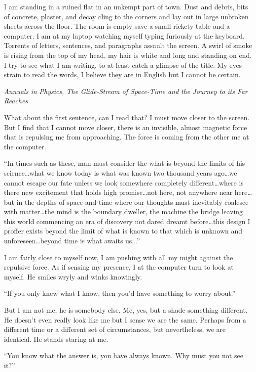 I am standing in a ruined flat in an unkempt part of town. Dust and
debris, bits of concrete, plaster, and decay cling to the corners and
lay out in large unbroken sheets across the floor. The room is empty
save a small rickety table and a computer. I am at my laptop watching
myself typing furiously at the keyboard. Torrents of letters, sentences,
and paragraphs assault the screen. A swirl of smoke is rising from the
top of my head, my hair is white and long and standing on end. I try to
see what I am writing, to at least catch a glimpse of the title. My eyes
strain to read the words, I believe they are in English but I cannot be
certain.

\emph{Annuals in Physics, The Glide-Stream of Space-Time and the Journey
to its Far Reaches}

What about the first sentence, can I read that? I must move closer to
the screen. But I find that I cannot move closer, there is an invisible,
almost magnetic force that is repulsing me from approaching. The force
is coming from the other me at the computer.

``In times such as these, man must consider the what is beyond the
limits of his science\ldots what we know today is what was known two
thousand years ago\ldots we cannot escape our fate unless we look
somewhere completely different\ldots where is there new excitement that
holds high promise\ldots not here, not anywhere near here\ldots but in
the depths of space and time where our thoughts must inevitably coalesce
with matter\ldots the mind is the boundary dweller, the machine the
bridge leaving this world commencing an era of discovery not dared
dreamt before\ldots this design I proffer exists beyond the limit of
what is known to that which is unknown and unforeseen\ldots beyond time
is what awaits us...''

I am fairly close to myself now, I am pushing with all my might against
the repulsive force. As if sensing my presence, I at the computer turn
to look at myself. He smiles wryly and winks knowingly.

``If you only knew what I know, then you'd have something to worry
about.''

But I am not me, he is somebody else. Me, yes, but a shade something
different. He doesn't even really look like me but I sense we are the
same. Perhaps from a different time or a different set of circumstances,
but nevertheless, we are identical. He stands staring at me.

``You know what the answer is, you have always known. Why must you not
see it?''

